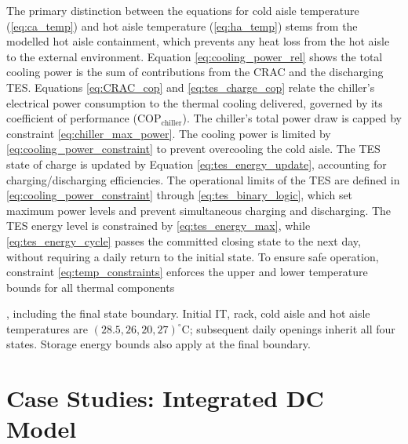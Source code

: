 \documentclass[lettersize,journal]{IEEEtran}
\providecommand{\DIFadd}[1]{{\color{blue}#1}}
\providecommand{\DIFaddbegin}{}
\providecommand{\DIFaddend}{}
\begin{document}
The primary distinction between the  \DIFaddbegin \DIFadd{equations }\DIFaddend for cold aisle temperature (\ref{eq:ca_temp}) and hot aisle temperature (\ref{eq:ha_temp})  stems from the modelled hot aisle containment, which prevents any heat loss from the hot aisle to the external environment. Equation \eqref{eq:cooling_power_rel} shows the total cooling power is the sum of contributions from the CRAC and the discharging TES. Equations \eqref{eq:CRAC_cop} and \eqref{eq:tes_charge_cop} relate the chiller's electrical power consumption to the thermal cooling delivered, governed by its  \DIFaddbegin \DIFadd{coefficient of performance }\DIFaddend ($\mathrm{COP}_{\mathrm{chiller}}$). The chiller's total power draw is capped by constraint \eqref{eq:chiller_max_power}. The cooling power is limited by \eqref{eq:cooling_power_constraint} to prevent overcooling the cold aisle. The TES state of charge is updated by Equation \eqref{eq:tes_energy_update}, accounting for charging/discharging efficiencies. The operational limits of the TES are defined in \eqref{eq:cooling_power_constraint} through \eqref{eq:tes_binary_logic}, which set maximum power levels and prevent simultaneous charging and discharging. The TES energy level is constrained by \eqref{eq:tes_energy_max}, while \eqref{eq:tes_energy_cycle}  \DIFaddbegin \DIFadd{passes the committed closing state to the next day, without requiring a daily return to the }\DIFaddend initial state.
To ensure safe operation, constraint \eqref{eq:temp_constraints} enforces the upper and lower temperature bounds for all thermal components \DIFaddbegin \DIFadd{, including the final state boundary. Initial IT, rack, cold aisle and hot aisle temperatures are $(28.5,26,20,27)^\circ$C; subsequent daily openings inherit all four states. Storage energy bounds also apply at the final boundary.
 
}\DIFaddend 


\section{Case Studies: Integrated DC Model}\label{sec:integrated_model and case studies}
\end{document}
